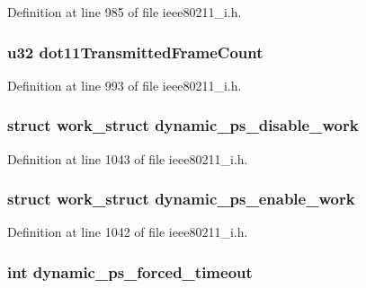 Definition at line 985 of file ieee80211\-\_\-i.\-h.

\hypertarget{structieee80211__local_a3067059726ca5e76782a558090bb0d44}{
\subsubsection[{dot11\-Transmitted\-Frame\-Count}]{\setlength{\rightskip}{0pt plus 5cm}u32 dot11\-Transmitted\-Frame\-Count}}\label{structieee80211__local_a3067059726ca5e76782a558090bb0d44}


Definition at line 993 of file ieee80211\-\_\-i.\-h.

\hypertarget{structieee80211__local_ae86c9b970f2f92364edee6f3002cae9e}{
\subsubsection[{dynamic\-\_\-ps\-\_\-disable\-\_\-work}]{\setlength{\rightskip}{0pt plus 5cm}struct work\-\_\-struct dynamic\-\_\-ps\-\_\-disable\-\_\-work}}\label{structieee80211__local_ae86c9b970f2f92364edee6f3002cae9e}


Definition at line 1043 of file ieee80211\-\_\-i.\-h.

\hypertarget{structieee80211__local_a0bea55b19dc8be14df12be0efa29ef2c}{
\subsubsection[{dynamic\-\_\-ps\-\_\-enable\-\_\-work}]{\setlength{\rightskip}{0pt plus 5cm}struct work\-\_\-struct dynamic\-\_\-ps\-\_\-enable\-\_\-work}}\label{structieee80211__local_a0bea55b19dc8be14df12be0efa29ef2c}


Definition at line 1042 of file ieee80211\-\_\-i.\-h.

\hypertarget{structieee80211__local_af82b7e878824a6ab444850f585b064d2}{
\subsubsection[{dynamic\-\_\-ps\-\_\-forced\-\_\-timeout}]{\setlength{\rightskip}{0pt plus 5cm}int dynamic\-\_\-ps\-\_\-forced\-\_\-timeout}}\label{structieee80211__local_af82b7e878824a6ab444850f585b064d2}



